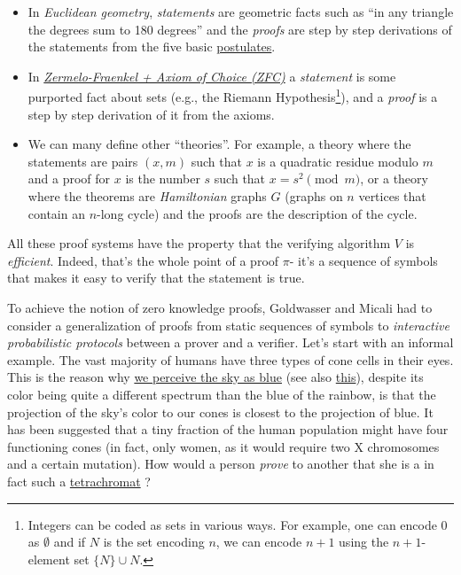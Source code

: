 \begin{itemize}
\item
  In \emph{Euclidean geometry}, \emph{statements} are geometric facts
  such as ``in any triangle the degrees sum to 180 degrees'' and the
  \emph{proofs} are step by step derivations of the statements from the
  five basic
  \href{https://en.wikipedia.org/wiki/Euclidean_geometry}{postulates}.
\item
  In
  \href{https://en.wikipedia.org/wiki/Zermelo\%E2\%80\%93Fraenkel_set_theory}{\emph{Zermelo-Fraenkel
  + Axiom of Choice (ZFC)}} a \emph{statement} is some purported fact
  about sets (e.g., the Riemann Hypothesis\footnote{Integers can be
    coded as sets in various ways. For example, one can encode \(0\) as
    \(\emptyset\) and if \(N\) is the set encoding \(n\), we can encode
    \(n+1\) using the \(n+1\)-element set \(\{ N \} \cup N\).}), and a
  \emph{proof} is a step by step derivation of it from the axioms.
\item
  We can many define other ``theories''. For example, a theory where the
  statements are pairs \((x,m)\) such that \(x\) is a quadratic residue
  modulo \(m\) and a proof for \(x\) is the number \(s\) such that
  \(x=s^2 \pmod{m}\), or a theory where the theorems are
  \emph{Hamiltonian} graphs \(G\) (graphs on \(n\) vertices that contain
  an \(n\)-long cycle) and the proofs are the description of the cycle.
\end{itemize}

All these proof systems have the property that the verifying algorithm
\(V\) is \emph{efficient}. Indeed, that's the whole point of a proof
\(\pi\)- it's a sequence of symbols that makes it easy to verify that
the statement is true.

To achieve the notion of zero knowledge proofs, Goldwasser and Micali
had to consider a generalization of proofs from static sequences of
symbols to \emph{interactive probabilistic protocols} between a prover
and a verifier. Let's start with an informal example. The vast majority
of humans have three types of cone cells in their eyes. This is the
reason why
\href{http://www.patarnott.com/atms749/pdf/blueSkyHumanResponse.pdf}{we
perceive the sky as blue} (see also
\href{https://www.forbes.com/sites/briankoberlein/2017/01/11/earths-skies-are-violet-we-just-see-them-as-blue/\#33aaaf0f735f}{this}),
despite its color being quite a different spectrum than the blue of the
rainbow, is that the projection of the sky's color to our cones is
closest to the projection of blue. It has been suggested that a tiny
fraction of the human population might have four functioning cones (in
fact, only women, as it would require two X chromosomes and a certain
mutation). How would a person \emph{prove} to another that she is a in
fact such a
\href{https://en.wikipedia.org/wiki/Tetrachromacy}{tetrachromat} ?

